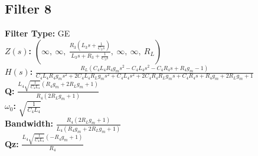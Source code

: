 \documentclass{article}
\begin{document}
\subsection*{Filter 8}
\textbf{Filter Type:} GE \\ 
\textbf{$Z(s)$:} $\left( \infty, \  \infty, \  \frac{R_{3} \left(L_{3} s + \frac{1}{C_{3} s}\right)}{L_{3} s + R_{3} + \frac{1}{C_{3} s}}, \  \infty, \  \infty, \  R_{L}\right)$ \\ 
\textbf{$H(s)$:} $\frac{R_{L} \left(C_{4} L_{4} R_{4} g_{m} s^{2} - C_{4} L_{4} s^{2} - C_{4} R_{4} s + R_{4} g_{m} - 1\right)}{C_{4} L_{4} R_{4} g_{m} s^{2} + 2 C_{4} L_{4} R_{L} g_{m} s^{2} + C_{4} L_{4} s^{2} + 2 C_{4} R_{4} R_{L} g_{m} s + C_{4} R_{4} s + R_{4} g_{m} + 2 R_{L} g_{m} + 1}$ \\ 
\textbf{Q:} $\frac{L_{4} \sqrt{\frac{1}{C_{4} L_{4}}} \left(R_{4} g_{m} + 2 R_{L} g_{m} + 1\right)}{R_{4} \left(2 R_{L} g_{m} + 1\right)}$ \\ 
\textbf{$\omega_0$:} $\sqrt{\frac{1}{C_{4} L_{4}}}$ \\ 
\textbf{Bandwidth:} $\frac{R_{4} \left(2 R_{L} g_{m} + 1\right)}{L_{4} \left(R_{4} g_{m} + 2 R_{L} g_{m} + 1\right)}$ \\ 
\textbf{Qz:} $\frac{L_{4} \sqrt{\frac{1}{C_{4} L_{4}}} \left(- R_{4} g_{m} + 1\right)}{R_{4}}$ \\ 
\end{document}
